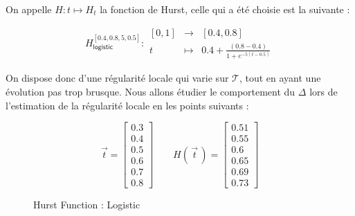 \begin{minipage}{0.47\linewidth}
	On appelle $H : t \mapsto H_t$ la fonction de Hurst, celle qui a été choisie est la suivante :

	$$
		H^{[0.4, 0.8, 5, 0.5]}_{\textsf{logistic}} : \begin{array}{ccc}
			[0,1] & \longrightarrow & [0.4, 0.8]
			\\
			t     & \longmapsto     & 0.4 + \frac{(0.8 - 0.4)}{1 + e^{-5(t - 0.5)}}
		\end{array}
	$$

	On dispose donc d'une régularité locale qui varie sur $\mathcal T$, tout en ayant une évolution pas trop brusque. Nous allons étudier le comportement du $\Delta$ lors de l'estimation de la régularité locale en les points suivants :

	$$
		\vec t = \begin{bmatrix} 0.3 \\ 0.4 \\ 0.5 \\ 0.6 \\ 0.7 \\ 0.8 \end{bmatrix}
		\quad\quad
		H(\, \vec t \,) =
		\begin{bmatrix}
			0.51 \\ 0.55 \\ 0.6 \\ 0.65 \\ 0.69 \\ 0.73
		\end{bmatrix}
	$$

\end{minipage}
\hfill
\begin{minipage}{0.47\linewidth}
	\begin{figure}[H]
		\centering
		\caption{Hurst Function : Logistic}
		\label{plot:hurst-logistic}
	\end{figure}
\end{minipage}


